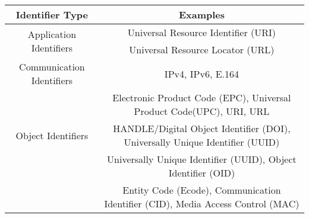 \documentclass{standalone}
\begin{document}
\begin{tabular}{ | c | c |}
       \hline
       Identifier Type  &  Examples  \\
       \hline
       \multirow{2}{*}{Application Identifiers}  &  Universal Resource Identifier (URI) \\
                                                 &  Universal Resource Locator (URL)    \\
       \hline
       Communication Identifiers & IPv4, IPv6, E.164 \\
       \hline
       \multirow{3}{*}{Object Identifiers} &  Electronic Product Code (EPC),  Universal Product Code(UPC), URI, URL           \\  
                                           &  HANDLE/Digital Object Identifier (DOI), Universally Unique Identifier (UUID)    \\
                                           &  Universally Unique Identifier (UUID),  Object Identifier (OID)                  \\
                                           &  Entity Code (Ecode), Communication Identifier (CID), Media Access Control (MAC) \\
       \hline
\end{tabular}
 
\end{document}
